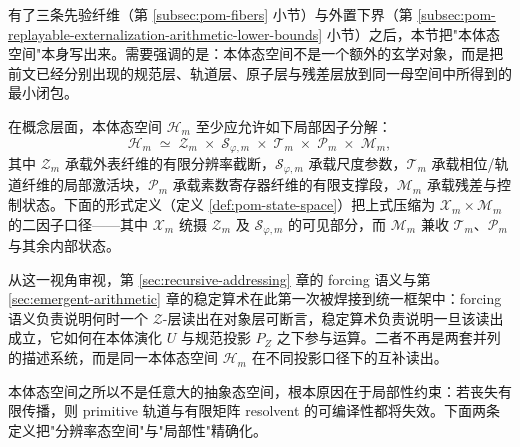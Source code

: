 有了三条先验纤维（第 \ref{subsec:pom-fibers} 小节）与外置下界（第 \ref{subsec:pom-replayable-externalization-arithmetic-lower-bounds} 小节）之后，本节把"本体态空间"本身写出来。需要强调的是：本体态空间不是一个额外的玄学对象，而是把前文已经分别出现的规范层、轨道层、原子层与残差层放到同一母空间中所得到的最小闭包。

在概念层面，本体态空间 $\mathcal{H}_m$ 至少应允许如下局部因子分解：
\begin{equation}\label{eq:pom-state-fiber-decomposition}
\mathcal{H}_m\;\simeq\;\mathcal{Z}_m\;\times\;\mathcal{S}_{\varphi,m}\;\times\;\mathcal{T}_m\;\times\;\mathcal{P}_m\;\times\;\mathcal{M}_m,
\end{equation}
其中 $\mathcal{Z}_m$ 承载外表纤维的有限分辨率截断，$\mathcal{S}_{\varphi,m}$ 承载尺度参数，$\mathcal{T}_m$ 承载相位/轨道纤维的局部激活块，$\mathcal{P}_m$ 承载素数寄存器纤维的有限支撑段，$\mathcal{M}_m$ 承载残差与控制状态。下面的形式定义（定义 \ref{def:pom-state-space}）把上式压缩为 $\mathcal{X}_m\times\mathcal{M}_m$ 的二因子口径——其中 $\mathcal{X}_m$ 统摄 $\mathcal{Z}_m$ 及 $\mathcal{S}_{\varphi,m}$ 的可见部分，而 $\mathcal{M}_m$ 兼收 $\mathcal{T}_m$、$\mathcal{P}_m$ 与其余内部状态。

从这一视角审视，第 \ref{sec:recursive-addressing} 章的 forcing 语义与第 \ref{sec:emergent-arithmetic} 章的稳定算术在此第一次被焊接到统一框架中：forcing 语义负责说明何时一个 $\mathcal{Z}$-层读出在对象层可断言，稳定算术负责说明一旦该读出成立，它如何在本体演化 $U$ 与规范投影 $P_Z$ 之下参与运算。二者不再是两套并列的描述系统，而是同一本体态空间 $\mathcal{H}_m$ 在不同投影口径下的互补读出。

本体态空间之所以不是任意大的抽象态空间，根本原因在于局部性约束：若丧失有限传播，则 primitive 轨道与有限矩阵 resolvent 的可编译性都将失效。下面两条定义把"分辨率态空间"与"局部性"精确化。
